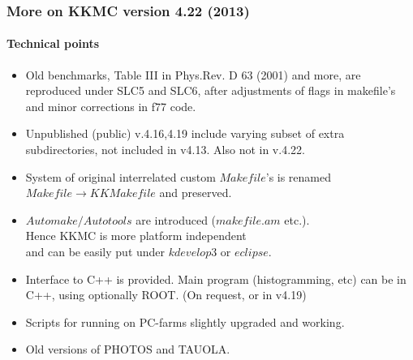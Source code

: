 \documentclass{beamer}
\begin{document}
\begin{frame}[fragile]
\frametitle{\bf More on KKMC version 4.22 (2013)}
\framesubtitle{\bf\large Technical points}
\small
\begin{itemize}
\item
Old benchmarks, Table III in Phys.Rev. D 63 (2001) and more,
are reproduced under SLC5 and SLC6, 
after adjustments of flags in makefile's
and minor corrections in f77 code.
\item
Unpublished (public) v.4.16,4.19 include varying subset of extra subdirectories,
not included in v4.13. Also not in v.4.22.
\item
System of original interrelated custom $Makefile$'s 
is renamed $Makefile\to KKMakefile$
and preserved.
\item
$Automake/Autotools$ are introduced ($makefile.am$ etc.).\\
Hence KKMC is more platform independent\\
and can be easily put under $kdevelop3$ or $eclipse$.
\item
Interface to C++ is provided.
Main program (histogramming, etc) can be in C++, using optionally ROOT.
(On request, or in v4.19)
\item
Scripts for running on PC-farms slightly upgraded and working.
\item
Old versions of PHOTOS and TAUOLA.
\end{itemize}
\end{frame}
\end{document}
